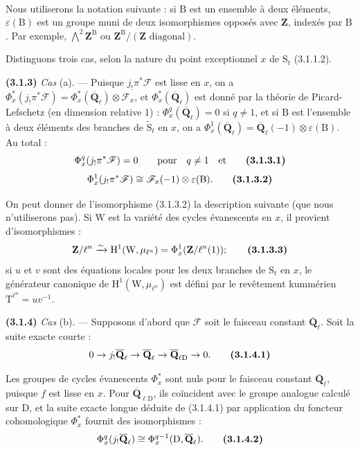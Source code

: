 \documentclass[11pt,leqno]{article}
\newcommand{\Page}[1]{\ifvmode\noindent\else\unskip\ \fi{\footnotesize\textcolor{gray}{[p.\,#1]}}\ \ignorespaces}
\begin{document}
\Page{199}

Nous utiliserons la notation suivante : si \(\mathrm B\) est un ensemble à deux éléments, \(\varepsilon(\mathrm B)\) est un groupe muni de deux isomorphismes opposés avec \(\mathbf Z\), indexés par \(\mathrm B\). Par exemple, \(\bigwedge\limits^{2}\mathbf Z^{\mathrm B}\) ou \(\mathbf Z^{\mathrm B}/(\mathbf Z\text{ diagonal})\).

Distinguons trois cas, selon la nature du point exceptionnel \(x\) de \(\mathrm S_t\) (3.1.1.2).

\textbf{(3.1.3)} \textit{Cas} (a). — Puisque \(j_!\pi^*\mathscr F\) est lisse en \(x\), on a \(\Phi_x^*(j_!\pi^*\mathscr F)=\Phi_x^*(\overline{\mathbf Q}_\ell)\otimes\mathscr F_x\), et \(\Phi_x^*(\overline{\mathbf Q}_\ell)\) est donné par la théorie de Picard-Lefschetz (en dimension relative \(1\)) : \(\Phi_x^q(\overline{\mathbf Q}_\ell)=0\) si \(q\ne1\), et si \(\mathrm B\) est l’ensemble à deux éléments des branches de \(\widetilde{\mathrm S}_t\) en \(x\), on a \(\Phi_x^1(\overline{\mathbf Q}_\ell)=\overline{\mathbf Q}_\ell(-1)\otimes\varepsilon(\mathrm B)\). Au total :
\[
\Phi_x^q(j_!\pi^*\mathscr F)=0
\qquad\text{pour}\quad q\ne1
\quad\text{et}
\tag*{\textbf{(3.1.3.1)}}
\]
\[
\Phi_x^1(j_!\pi^*\mathscr F)
\cong\mathscr F_x(-1)\otimes\varepsilon(\mathrm B).
\tag*{\textbf{(3.1.3.2)}}
\]

On peut donner de l’isomorphisme (3.1.3.2) la description suivante (que nous n’utiliserons pas). Si \(\mathrm W\) est la variété des cycles évanescents en \(x\), il provient d’isomorphismes :
\[
\mathbf Z/\ell^n
\xrightarrow{\sim}
\mathrm H^1(\mathrm W,\mu_{\ell^n})
=\Phi_x^1(\mathbf Z/\ell^n(1));
\tag*{\textbf{(3.1.3.3)}}
\]
si \(u\) et \(v\) sont des équations locales pour les deux branches de \(\mathrm S_t\) en \(x\), le générateur canonique de \(\mathrm H^1(\mathrm W,\mu_{\ell^n})\) est défini par le revêtement kummérien \(\mathrm T^{\ell^n}=uv^{-1}\).

\textbf{(3.1.4)} \textit{Cas} (b). — Supposons d’abord que \(\mathscr F\) soit le faisceau constant \(\overline{\mathbf Q}_\ell\). Soit la suite exacte courte :
\[
0\to j_!\overline{\mathbf Q}_\ell
\to\overline{\mathbf Q}_\ell
\to\overline{\mathbf Q}_{\ell\mathrm D}\to0.
\tag*{\textbf{(3.1.4.1)}}
\]

Les groupes de cycles évanescents \(\Phi_x^*\) sont nuls pour le faisceau constant \(\overline{\mathbf Q}_\ell\), puisque \(f\) est lisse en \(x\). Pour \(\overline{\mathbf Q}_{\ell\mathrm D}\), ils coïncident avec le groupe analogue calculé sur \(\mathrm D\), et la suite exacte longue déduite de (3.1.4.1) par application du foncteur cohomologique \(\Phi_x^*\) fournit des isomorphismes :
\[
\Phi_x^q(j_!\overline{\mathbf Q}_\ell)
\cong\Phi_x^{q-1}(\mathrm D,\overline{\mathbf Q}_\ell).
\tag*{\textbf{(3.1.4.2)}}
\]
\end{document}
